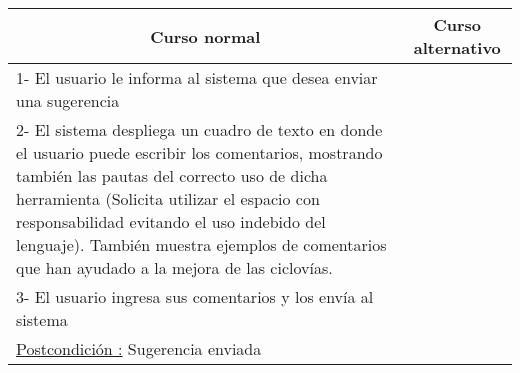 \begin{center}
    \centering
    \begin{tabular}{ | p{11cm} | p{6cm} | }
    	\multicolumn{1}{c}{\cellcolor{black!30}\textbf{Curso normal}} & 
    	\multicolumn{1}{c}{\cellcolor{black!30}\textbf{Curso alternativo}} \\
		\hline
		1- El usuario le informa al sistema que desea enviar una sugerencia & \\ \hline
		2- El sistema despliega un cuadro de texto en donde el usuario puede escribir los comentarios,
		mostrando también las pautas del correcto uso de dicha herramienta (Solicita
		utilizar el espacio con
		responsabilidad evitando el uso indebido del lenguaje).
		También muestra ejemplos de comentarios que han ayudado a la mejora de las ciclovías. & \\ \hline
		3- El usuario ingresa sus comentarios y los envía al sistema & \\ \hline
		\underline{Postcondición :} Sugerencia enviada & \\ \hline
    \end{tabular}
\end{center}




